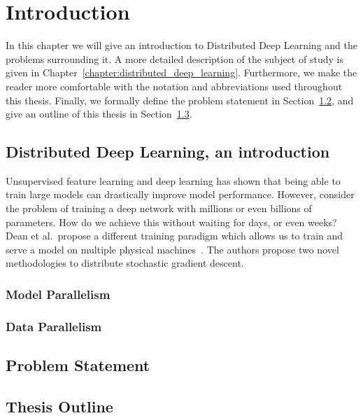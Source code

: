 %
%
%

\chapter{Introduction}
\label{chapter:introduction}

In this chapter we will give an introduction to Distributed Deep Learning and the problems surrounding it. A more detailed description of the subject of study is given in Chapter~\ref{chapter:distributed_deep_learning}. Furthermore, we make the reader more comfortable with the notation and abbreviations used throughout this thesis. Finally, we formally define the problem statement in Section~\ref{sec:problem_statement}, and give an outline of this thesis in Section~\ref{sec:thesis_outline}.

\section[Distributed Deep Learning]{Distributed Deep Learning, an introduction}
\label{sec:intro_distributed_deep_learning}

Unsupervised feature learning and deep learning has shown that being able to train large models can drastically improve model performance. However, consider the problem of training a deep network with millions or even billions of parameters. How do we achieve this without waiting for days, or even weeks? Dean et al.~propose a different training paradigm which allows us to train and serve a model on multiple physical machines~\cite{dean2012large}. The authors propose two novel methodologies to distribute stochastic gradient descent.

\subsection{Model Parallelism}
\label{sec:intro_model_parallelism}

\subsection{Data Parallelism}
\label{sec:intro_data_parallelism}

\section{Problem Statement}
\label{sec:problem_statement}

\section{Thesis Outline}
\label{sec:thesis_outline}
